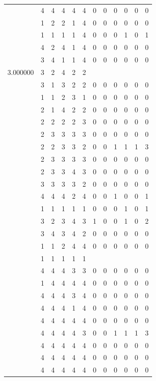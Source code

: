 \documentclass[]{book}
\theoremstyle{definition}
\theoremstyle{definition}
\theoremstyle{definition}
\theoremstyle{remark}
\begin{document}
\begin{table}
{\begin{tabular}[t]{rrrrrrrrrrrr}
 & 4 & 4 & 4 & 4 & 4 & 0 & 0 & 0 & 0 & 0 & 0\\
 & 1 & 2 & 2 & 1 & 4 & 0 & 0 & 0 & 0 & 0 & 0\\
 & 1 & 1 & 1 & 1 & 4 & 0 & 0 & 0 & 1 & 0 & 1\\
 & 4 & 2 & 4 & 1 & 4 & 0 & 0 & 0 & 0 & 0 & 0\\
 & 3 & 4 & 1 & 1 & 4 & 0 & 0 & 0 & 0 & 0 & 0\\
3.000000 & 3 & 2 & 4 & 2 & 2 &  &  &  &  &  & \\
 & 3 & 1 & 3 & 2 & 2 & 0 & 0 & 0 & 0 & 0 & 0\\
 & 1 & 1 & 2 & 3 & 1 & 0 & 0 & 0 & 0 & 0 & 0\\
 & 2 & 1 & 4 & 2 & 2 & 0 & 0 & 0 & 0 & 0 & 0\\
 & 2 & 2 & 2 & 2 & 3 & 0 & 0 & 0 & 0 & 0 & 0\\
 & 2 & 3 & 3 & 3 & 3 & 0 & 0 & 0 & 0 & 0 & 0\\
 & 2 & 2 & 3 & 3 & 2 & 0 & 0 & 1 & 1 & 1 & 3\\
 & 2 & 3 & 3 & 3 & 3 & 0 & 0 & 0 & 0 & 0 & 0\\
 & 2 & 3 & 3 & 4 & 3 & 0 & 0 & 0 & 0 & 0 & 0\\
 & 3 & 3 & 3 & 3 & 2 & 0 & 0 & 0 & 0 & 0 & 0\\
 & 4 & 4 & 4 & 2 & 4 & 0 & 0 & 1 & 0 & 0 & 1\\
 & 1 & 1 & 1 & 1 & 1 & 0 & 0 & 0 & 1 & 0 & 1\\
 & 3 & 2 & 3 & 4 & 3 & 1 & 0 & 0 & 1 & 0 & 2\\
 & 3 & 4 & 3 & 4 & 2 & 0 & 0 & 0 & 0 & 0 & 0\\
 & 1 & 1 & 2 & 4 & 4 & 0 & 0 & 0 & 0 & 0 & 0\\
 & 1 & 1 & 1 & 1 & 1 &  &  &  &  &  & \\
 & 4 & 4 & 4 & 3 & 3 & 0 & 0 & 0 & 0 & 0 & 0\\
 & 1 & 4 & 4 & 4 & 4 & 0 & 0 & 0 & 0 & 0 & 0\\
 & 4 & 4 & 4 & 3 & 4 & 0 & 0 & 0 & 0 & 0 & 0\\
 & 4 & 4 & 4 & 1 & 4 & 0 & 0 & 0 & 0 & 0 & 0\\
 & 4 & 4 & 4 & 4 & 4 & 0 & 0 & 0 & 0 & 0 & 0\\
 & 4 & 4 & 4 & 4 & 3 & 0 & 0 & 1 & 1 & 1 & 3\\
 & 4 & 4 & 4 & 4 & 4 & 0 & 0 & 0 & 0 & 0 & 0\\
 & 4 & 4 & 4 & 4 & 4 & 0 & 0 & 0 & 0 & 0 & 0\\
 & 4 & 4 & 4 & 4 & 4 & 0 & 0 & 0 & 0 & 0 & 0\\

\end{tabular}}
\end{table}
\end{document}
